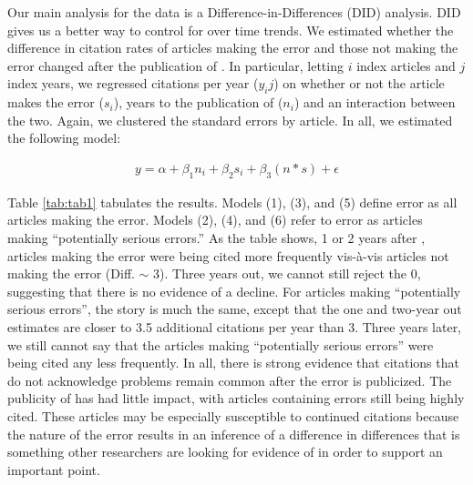 Our main analysis for the \citeauthor{nieuwenhuis2011} data is a Difference-in-Differences (DID) analysis. DID gives us a better way to control for over time trends. We estimated whether the difference in citation rates of articles making the error and those not making the error changed after the publication of \citet{nieuwenhuis2011}. In particular, letting $i$ index articles and $j$ index years, we regressed citations per year ($y_ij$) on whether or not the article makes the error ($s_i$), years to the publication of \citeauthor{nieuwenhuis2011} ($n_i$) and an interaction between the two. Again, we clustered the standard errors by article. In all, we estimated the following model:

\begin{align}
\label{eqn:eqn2}
y = \alpha + \beta_1 n_i + \beta_2 s_i + \beta_3 (n*s) + \epsilon
\end{align}

Table \ref{tab:tab1} tabulates the results. Models (1), (3), and (5) define error as all articles making the error. Models (2), (4), and (6) refer to error as articles making ``potentially serious errors.'' As the table shows, 1 or 2 years after \citet{nieuwenhuis2011}, articles making the error were being cited more frequently vis-\`a-vis articles not making the error (Diff. $\sim$ 3). Three years out, we cannot still reject the 0, suggesting that there is no evidence of a decline. For articles making ``potentially serious errors'', the story is much the same, except that the one and two-year out estimates are closer to 3.5 additional citations per year than 3. Three years later, we still cannot say that the articles making ``potentially serious errors'' were being cited any less frequently.  In all, there is strong evidence that citations that do not acknowledge problems remain common after the error is publicized. The publicity of \citeauthor{nieuwenhuis2011} has had little impact, with articles containing errors still being highly cited. These articles may be especially susceptible to continued citations because the nature of the error results in an inference of a difference in differences that is something other researchers are looking for evidence of in order to support an important point.


